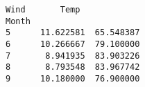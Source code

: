 \documentclass[11pt]{article}
\begin{document}
    \begin{Verbatim}[commandchars=\\\{\}]
            Wind       Temp
Month                      
5      11.622581  65.548387
6      10.266667  79.100000
7       8.941935  83.903226
8       8.793548  83.967742
9      10.180000  76.900000

    \end{Verbatim}

    \begin{center}
    \end{center}
    { \hspace*{\fill} \\}
    

    
    
    
    
\end{document}
